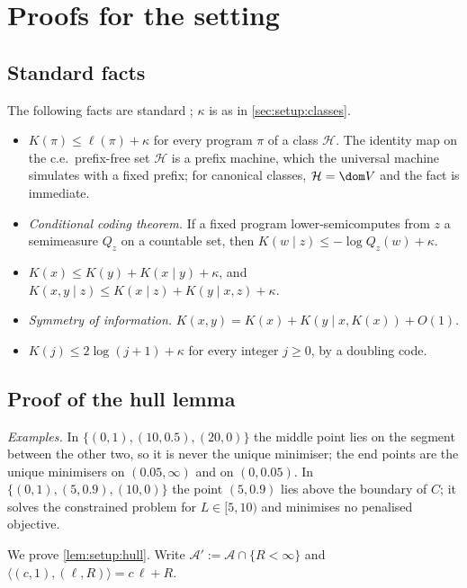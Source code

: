 \section{Proofs for the setting}\label{app:setup}

\subsection{Standard facts}\label{app:setup:facts}

The following facts are standard \citep{li2008introduction}; $\kappa$ is as in \cref{sec:setup:classes}.
\begin{itemize}
\item[(F1)] $K(\pi)\le\ell(\pi)+\kappa$ for every program $\pi$ of a class $\mathcal H$. The identity map on the c.e.\ prefix-free set $\mathcal H$ is a prefix machine, which the universal machine simulates with a fixed prefix; for canonical classes, $\mathcal H=\dom V$ and the fact is immediate.
\item[(F2)] \emph{Conditional coding theorem.} If a fixed program lower-semicomputes from $z$ a semimeasure $Q_z$ on a countable set, then $K(w\mid z)\le-\log Q_z(w)+\kappa$.
\item[(F3)] $K(x)\le K(y)+K(x\mid y)+\kappa$, and $K(x,y\mid z)\le K(x\mid z)+K(y\mid x,z)+\kappa$.
\item[(F4)] \emph{Symmetry of information.} $K(x,y)=K(x)+K(y\mid x,K(x))+O(1)$.
\item[(F5)] $K(j)\le2\log(j+1)+\kappa$ for every integer $j\ge0$, by a doubling code.
\end{itemize}

\subsection{Proof of the hull lemma}\label{app:setup:hull}

\emph{Examples.} In $\{(0,1),(10,0.5),(20,0)\}$ the middle point lies on the segment between the other two, so it is never the unique minimiser; the end points are the unique minimisers on $(0.05,\infty)$ and on $(0,0.05)$. In $\{(0,1),(5,0.9),(10,0)\}$ the point $(5,0.9)$ lies above the boundary of $C$; it solves the constrained problem for $L\in[5,10)$ and minimises no penalised objective.

We prove \cref{lem:setup:hull}. Write $\mathcal A':=\mathcal A\cap\{R<\infty\}$ and $\langle(c,1),(\ell,R)\rangle=c\,\ell+R$.

